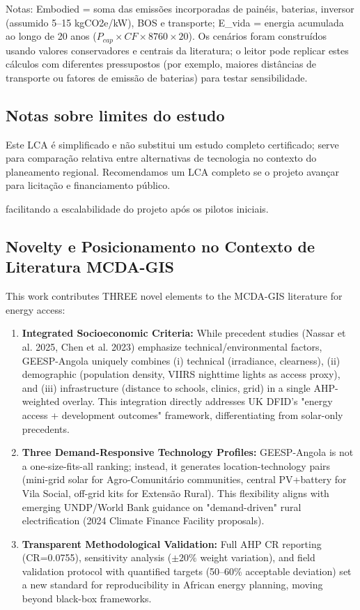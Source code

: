 \documentclass[12pt, a4paper]{article}
\begin{document}
\noindent Notas: Embodied = soma das emissões incorporadas de painéis, baterias, inversor (assumido 5--15 kgCO2e/kW), BOS e transporte; E\_vida = energia acumulada ao longo de 20 anos ($P_{cap}\times CF\times 8760\times 20$). Os cenários foram construídos usando valores conservadores e centrais da literatura; o leitor pode replicar estes cálculos com diferentes pressupostos (por exemplo, maiores distâncias de transporte ou fatores de emissão de baterias) para testar sensibilidade.

\subsection{Notas sobre limites do estudo}
Este LCA é simplificado e não substitui um estudo completo certificado; serve para
comparação relativa entre alternativas de tecnologia no contexto do planeamento regional.
Recomendamos um LCA completo se o projeto avançar para licitação e financiamento público.

facilitando a escalabilidade do projeto após os pilotos iniciais.

\subsection{Novelty e Posicionamento no Contexto de Literatura MCDA-GIS}

This work contributes THREE novel elements to the MCDA-GIS literature for energy access:

\begin{enumerate}
  \item \textbf{Integrated Socioeconomic Criteria:} While precedent studies (Nassar et al. 2025, Chen et al. 2023) emphasize technical/environmental factors, GEESP-Angola uniquely combines (i) technical (irradiance, clearness), (ii) demographic (population density, VIIRS nighttime lights as access proxy), and (iii) infrastructure (distance to schools, clinics, grid) in a single AHP-weighted overlay. This integration directly addresses UK DFID's "energy access + development outcomes" framework, differentiating from solar-only precedents.
  \item \textbf{Three Demand-Responsive Technology Profiles:} GEESP-Angola is not a one-size-fits-all ranking; instead, it generates location-technology pairs (mini-grid solar for Agro-Comunitário communities, central PV+battery for Vila Social, off-grid kits for Extensão Rural). This flexibility aligns with emerging UNDP/World Bank guidance on "demand-driven" rural electrification (2024 Climate Finance Facility proposals).
  \item \textbf{Transparent Methodological Validation:} Full AHP CR reporting (CR=0.0755), sensitivity analysis ($\pm 20\%$ weight variation), and field validation protocol with quantified targets (50--60\% acceptable deviation) set a new standard for reproducibility in African energy planning, moving beyond black-box frameworks.
\end{enumerate}
\end{document}
